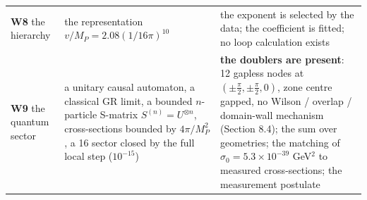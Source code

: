 \documentclass[aps,prd,amsmath,amssymb,superscriptaddress,longbibliography,floatfix,preprint]{revtex4-2}
\begin{document}
{\begin{longtable}{lll}
\arrayrulecolor{black!40}\hline\arrayrulecolor{black}
\parbox[c]{3.6cm}{\vspace{2.5pt}\raggedright {} \textbf{W8} the hierarchy\vspace{2.5pt}} & \parbox[c]{5.21cm}{\vspace{2.5pt}\raggedright {} the representation $v/M_P = 2.08(1/16\pi)^{10}$\vspace{2.5pt}} & \parbox[c]{6.29cm}{\vspace{2.5pt}\raggedright {} the exponent is selected by the data; the coefficient is fitted; no loop calculation exists\vspace{2.5pt}} \\
\hline{}
\parbox[c]{3.6cm}{\vspace{2.5pt}\raggedright {} \textbf{W9} the quantum sector\vspace{2.5pt}} & \parbox[c]{5.21cm}{\vspace{2.5pt}\raggedright {} a unitary causal automaton, a classical GR limit, a bounded \mbox{$n$}-particle S-matrix \mbox{$S^{(n)} = U^{\otimes n}$}, cross-sections bounded by \mbox{$4\pi/M_P^2$}, a 16 sector closed by the full local step (\mbox{$10^{-15}$})\vspace{2.5pt}} & \parbox[c]{6.29cm}{\vspace{2.5pt}\raggedright {} \textbf{the doublers are present}: 12 gapless nodes at \mbox{$(\pm\tfrac\pi2,\pm\tfrac\pi2,0)$}, zone centre gapped, no Wilson / overlap / domain-wall mechanism (Section 8.4); the sum over geometries; the matching of \mbox{$\sigma_0 = 5.3\times10^{-39}$} GeV\mbox{$^2$} to measured cross-sections; the measurement postulate\vspace{2.5pt}} \\
\end{longtable}
}
\end{document}
